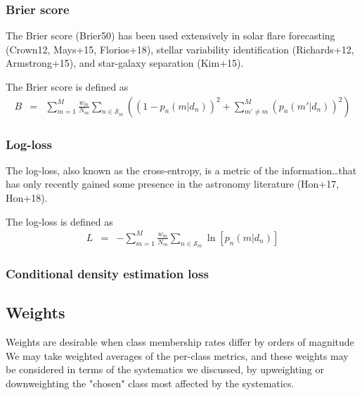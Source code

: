 \subsubsection{Brier score}
\label{sec:brier}

The Brier score (Brier50) has been used extensively in solar flare forecasting (Crown12, Mays+15, Florios+18), stellar variability identification (Richards+12, Armstrong+15), and star-galaxy separation (Kim+15).

The Brier score is defined as
\begin{eqnarray}
B &=& \sum_{m=1}^{M}\frac{w_{m}}{N_{m}}\sum_{n\in\mathcal{S}_{m}}\left((1-p_{n}(m | d_{n}))^{2}+\sum_{m'\neq m}^{M}(p_{n}(m' | d_{n}))^{2}\right)
\end{eqnarray}

\subsubsection{Log-loss}
\label{sec:logloss}


The log-loss, also known as the cross-entropy, is a metric of the information\dots that has only recently gained some presence in the astronomy literature (Hon+17, Hon+18).

The log-loss is defined as
\begin{eqnarray}
L &=& -\sum_{m=1}^{M}\frac{w_{m}}{N_{m}}\sum_{n\in\mathcal{S}_{m}}\ln[p_{n}(m | d_{n})]
\end{eqnarray}

\subsubsection{Conditional density estimation loss}
\label{sec:cdeloss}


\subsection{Weights}
\label{sec:weights}


Weights are desirable when class membership rates differ by orders of magnitude
We may take weighted averages of the per-class metrics, and these weights may be considered in terms of the systematics we discussed, by upweighting or downweighting the "chosen" class most affected by the systematics.

